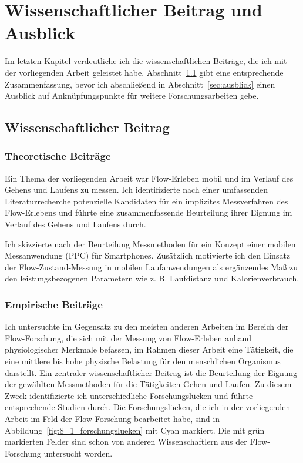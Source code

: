 \chapter{Wissenschaftlicher Beitrag und Ausblick} 
\label{cha:wissenschaftlicher_beitrag_und_ausblick}
Im letzten Kapitel verdeutliche ich die wissenschaftlichen Beiträge, die ich mit der vorliegenden Arbeit geleistet habe. Abschnitt~\ref{sec:wissenschaftlicher_beitrag} gibt eine entsprechende Zusammenfassung, bevor ich abschließend in Abschnitt~\ref{sec:ausblick} einen Ausblick auf Anknüpfungspunkte für weitere Forschungsarbeiten gebe.

\section{Wissenschaftlicher Beitrag}
\label{sec:wissenschaftlicher_beitrag} 
\subsection{Theoretische Beiträge}
Ein Thema der vorliegenden Arbeit war Flow-Erleben mobil und im Verlauf des Gehens und Laufens zu messen. Ich identifizierte nach einer umfassenden Literaturrecherche potenzielle Kandidaten für ein implizites Messverfahren des Flow-Erlebens und führte eine zusammenfassende Beurteilung ihrer Eignung im Verlauf des Gehens und Laufens durch. 

Ich skizzierte nach der Beurteilung Messmethoden für ein Konzept einer mobilen Messanwendung (\ac{PPC}) für Smartphones. Zusätzlich motivierte ich den Einsatz der Flow-Zustand-Messung in mobilen Laufanwendungen als ergänzendes Maß zu den leistungsbezogenen Parametern wie z. B. Laufdistanz und Kalorienverbrauch.

\subsection{Empirische Beiträge} 
Ich untersuchte im Gegensatz zu den meisten anderen Arbeiten im Bereich der Flow-Forschung, die sich mit der Messung von Flow-Erleben anhand physiologischer Merkmale befassen, im Rahmen dieser Arbeit eine Tätigkeit, die eine mittlere bis hohe physische Belastung für den menschlichen Organismus darstellt. Ein zentraler wissenschaftlicher Beitrag ist die Beurteilung der Eignung der gewählten Messmethoden für die Tätigkeiten Gehen und Laufen. Zu diesem Zweck identifizierte ich unterschiedliche Forschungslücken und führte entsprechende Studien durch. Die Forschungslücken, die ich in der vorliegenden Arbeit im Feld der Flow-Forschung bearbeitet habe, sind in Abbildung~\ref{fig:8_1_forschungslueken} mit Cyan markiert. Die mit grün markierten Felder sind schon von anderen Wissenschaftlern aus der Flow-Forschung untersucht worden. 


